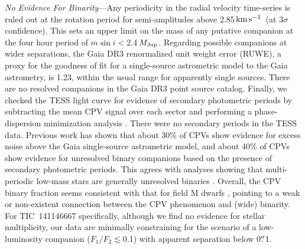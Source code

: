\documentclass{nature3}
\newcommand{\farcs}{\mbox{\ensuremath{.\!\!^{\prime\prime}}}}%
\newcommand{\kms}{\ensuremath{\rm km\,s^{-1}}}
\begin{document}
\begin{methods}

{\it No Evidence For Binarity}---Any periodicity in the radial
velocity time-series is ruled out at the rotation period for
semi-amplitudes above 2.85\,\kms\ (at 3$\sigma$ confidence).  This
sets an upper limit on the mass of any putative companion at the four
hour period of $m \sin i $$<$2.4\,$M_{\rm Jup}$.  Regarding possible
companions at wider separations, the Gaia DR3 renormalized unit weight
error (RUWE), a proxy for the goodness of fit for a single-source
astrometric model to the Gaia astrometry, is 1.23, within the usual
range for apparently single sources.  There are no resolved companions
in the Gaia DR3 point source catalog.  Finally, we checked the TESS
light curve for evidence of secondary photometric periods by
subtracting the mean CPV signal over each sector and performing a
phase-dispersion minimization analysis
\cite{Stellingwerf1978,2021zndo...1011188B}.  There were no secondary
periods in the TESS data.  Previous work \cite{Bouma2024} has shown
that about 30\% of CPVs show evidence for excess noise above the Gaia
single-source astrometric model, and about 40\% of CPVs show evidence
for unresolved binary companions based on the presence of secondary
photometric periods.  This agrees with analyses showing that
multi-periodic low-mass stars are generally unresolved binaries
\cite{Tokovinin2018}.  Overall, the CPV binary fraction seems
consistent with that for field M dwarfs \cite{Winters2019}, pointing
to a weak or non-existent connection between the CPV phenomenon and
(wide) binarity.  For TIC~141146667 specifically, although we find no
evidence for stellar multiplicity, our data are minimally constraining
for the scenario of a low-luminosity companion
($F_1$/$F_2$$\lesssim$0.1) with apparent separation below 0$\farcs$1.



\end{methods}
\end{document}

